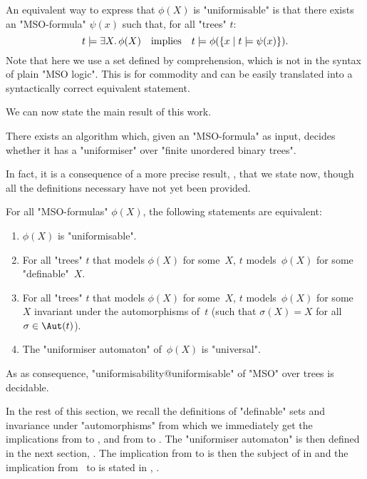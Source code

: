 \documentclass[a4paper,UKenglish,cleveref, autoref, thm-restate]{lipics-v2021}
\begin{document}
\begin{remark}\label{remark:uniformisability}
	An equivalent way to express that $\phi(X)$ is "uniformisable" is that there exists an "MSO-formula" $\psi(x)$ such that, for all "trees" $t$:
	\[
		t \models \exists X.\, \phi(X) \quad \text{implies} \quad t \models \phi(\left\{x \mid t \models \psi(x)\right\}).
	\]
	Note that here we use a set defined by comprehension, which is not in the syntax of plain "MSO logic".
	This is for commodity and can be easily translated into a syntactically correct equivalent statement.
\end{remark}

We can now state the main result of this work.
\begin{theorem} \label{thm:uniformisability-decision}\label{theorem:main}
	There exists an algorithm which, given an "MSO-formula" as input, decides whether it has a "uniformiser" over "finite unordered binary trees".
\end{theorem}

In fact, it is a consequence of a more precise result, , that we state now, though all the definitions necessary have not yet been provided.
\begin{lemma}\label{lem:main-result}\label{lemma:main}
	For all "MSO-formulas" $\phi(X)$, the following statements are equivalent:
	\begin{enumerate}
		\item $\phi(X)$ is "uniformisable". \label{lem:main-result-1}
		\item For all "trees" $t$ that models $\phi(X)$ for some~$X$, $t$ models~$\phi(X)$ for some "definable"~$X$. \label{lem:main-result-2}
		\item For all "trees" $t$ that models $\phi(X)$ for some~$X$, $t$ models~$\phi(X)$ for some~$X$ invariant under the automorphisms of~$t$ (\ie such that $\sigma(X) = X$ for all $\sigma \in \Aut(t)$). \label{lem:main-result-3}
		\item The "uniformiser automaton" of~$\phi(X)$ is "universal". \label{lem:main-result-4}
	\end{enumerate}
	As as consequence, "uniformisability@uniformisable" of "MSO" over trees is decidable.
\end{lemma}

In the rest of this section, we recall the definitions of "definable" sets and invariance under "automorphisms" from which we immediately get the implications from
 to , and from  to . The "uniformiser automaton"
is then defined in the next section, . The implication from  to  is then the subject of
 in  and the implication from~ to  is stated in
, .
\end{document}
